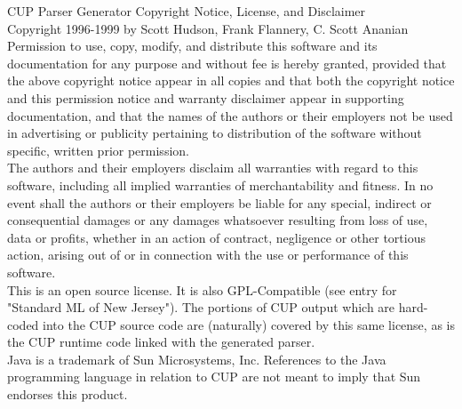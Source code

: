 CUP Parser Generator Copyright Notice, License, and Disclaimer \\
Copyright 1996-1999 by Scott Hudson, Frank Flannery, C. Scott Ananian \\

\noindent
Permission to use, copy, modify, and distribute this software and its
documentation for any purpose and without fee is hereby granted, provided that
the above copyright notice appear in all copies and that both the copyright
notice and this permission notice and warranty disclaimer appear in supporting
documentation, and that the names of the authors or their employers not be
used in advertising or publicity pertaining to distribution of the software
without specific, written prior permission. \\

\noindent
The authors and their employers disclaim all warranties with regard to this
software, including all implied warranties of merchantability and fitness.  In
no event shall the authors or their employers be liable for any special,
indirect or consequential damages or any damages whatsoever resulting from
loss of use, data or profits, whether in an action of contract, negligence or
other tortious action, arising out of or in connection with the use or
performance of this software. \\

\noindent
This is an open source license.  It is also GPL-Compatible (see entry for
"Standard ML of New Jersey").  The portions of CUP output which are hard-coded
into the CUP source code are (naturally) covered by this same license, as is
the CUP runtime code linked with the generated parser. \\

\noindent
Java is a trademark of Sun Microsystems, Inc.  References to the Java
programming language in relation to CUP are not meant to imply that Sun
endorses this product. 

